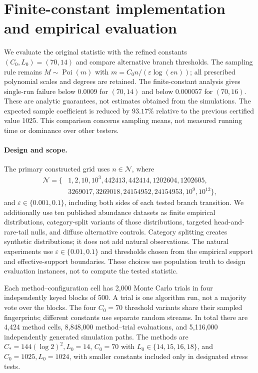 \section{Finite-constant implementation and empirical evaluation}
\label{sec:finite-experiments}
We evaluate the original statistic with the refined constants
$(C_0,L_0)=(70,14)$ and compare alternative branch thresholds.
The sampling rule remains $M\sim\operatorname{Poi}(m)$ with
$m=C_0n/(\varepsilon\log(en))$; all prescribed polynomial scales and
degrees are retained. The finite-constant analysis gives single-run
failure below $0.0009$ for $(70,14)$ and below $0.000057$ for $(70,16)$.
These are analytic guarantees, not estimates obtained from the simulations.
The expected sample coefficient is reduced by $93.17\%$ relative to the
previous certified value 1025. This comparison concerns sampling means,
not measured running time or dominance over other testers.

\paragraph{Design and scope.}
The primary constructed grid uses $n\in\mathcal N$, where
\[
\begin{aligned}
\mathcal N=\{&1,2,10,10^3,442413,442414,1202604,1202605,\\
             &3269017,3269018,24154952,24154953,10^9,10^{12}\},
\end{aligned}
\]
and $\varepsilon\in\{0.001,0.1\}$, including both sides of each tested branch
transition. We additionally use ten published abundance datasets as finite
empirical distributions, category-split variants of those distributions,
targeted head-and-rare-tail nulls, and diffuse alternative controls.
Category splitting creates synthetic distributions; it does not add
natural observations. The natural experiments use
$\varepsilon\in\{0.01,0.1\}$ and thresholds chosen from the empirical
support and effective-support boundaries. These choices use population
truth to design evaluation instances, not to compute the tested statistic.

Each method--configuration cell has 2,000 Monte Carlo trials in four
independently keyed blocks of 500. A trial is one algorithm run, not a
majority vote over the blocks. The four $C_0=70$ threshold variants share
their sampled fingerprints; different constants use separate random
streams. In total there are 4,424 method cells, 8,848,000 method--trial
evaluations, and 5,116,000 independently generated simulation paths.
The methods are $C_*=144(\log2)^2,L_0=14$, $C_0=70$ with
$L_0\in\{14,15,16,18\}$, and $C_0=1025,L_0=1024$, with smaller
constants included only in designated stress tests.

